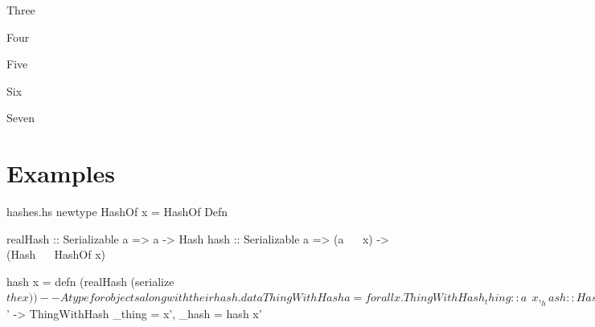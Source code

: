 \documentclass{beamer}
\begin{document}
\begin{frame}{Three}

\end{frame}


\begin{frame}{Four}

\end{frame}

\begin{frame}{Five}

\end{frame}

\begin{frame}{Six}

\end{frame}


\begin{frame}{Seven}

\end{frame}

  \section{Examples}   %

\begin{filecontents*}{hashes.hs}
newtype HashOf x = HashOf Defn

realHash :: Serializable a =>  a       ->  Hash
hash     :: Serializable a => (a ~~ x) -> (Hash ~~ HashOf x)

hash x = defn (realHash (serialize $ the x))

-- A type for objects along with their hash.
data ThingWithHash a = forall x. ThingWithHash
  { _thing :: a    ~~ x
  , _hash  :: Hash ~~ HashOf x }

-- Use it like this:
hashIt :: Serializable a => a -> ThingWithHash a
hashIt x = name x $ \x' ->
  ThingWithHash { _thing = x', _hash = hash x' }
                          
    
\end{filecontents*}
\end{document}
